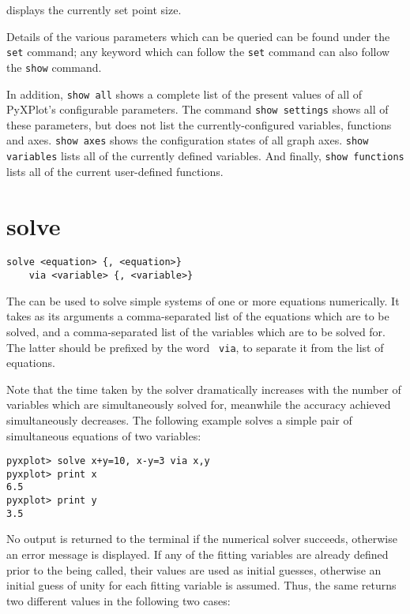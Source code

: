 \noindent displays the currently set point size.

Details of the various parameters which can be queried can be found under the
{\tt set} command; any keyword which can follow the {\tt set} command can also
follow the {\tt show} command.

In addition, {\tt show all} shows a complete list of the present values of all
of PyXPlot's configurable parameters.  The command {\tt show settings} shows
all of these parameters, but does not list the currently-configured variables,
functions and axes. {\tt show axes} shows the configuration states of all graph
axes. {\tt show variables} lists all of the currently defined variables. And
finally, {\tt show functions} lists all of the current user-defined functions.


\section{solve}

\begin{verbatim}
solve <equation> {, <equation>}
    via <variable> {, <variable>}
\end{verbatim}

The  can be used to solve simple systems of one or more
equations numerically. It takes as its arguments a comma-separated list of the
equations which are to be solved, and a comma-separated list of the variables
which are to be solved for. The latter should be prefixed by the word {\tt
via}, to separate it from the list of equations.

Note that the time taken by the solver dramatically increases with the number
of variables which are simultaneously solved for, meanwhile the accuracy
achieved simultaneously decreases. The following example solves a simple pair
of simultaneous equations of two variables:

\begin{verbatim}
pyxplot> solve x+y=10, x-y=3 via x,y
pyxplot> print x
6.5
pyxplot> print y
3.5
\end{verbatim}

\noindent No output is returned to the terminal if the numerical solver
succeeds, otherwise an error message is displayed. If any of the fitting
variables are already defined prior to the  being called, their
values are used as initial guesses, otherwise an initial guess of unity for
each fitting variable is assumed. Thus, the same  returns two
different values in the following two cases:

